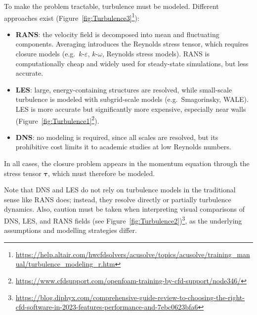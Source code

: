 To make the problem tractable, turbulence must be modeled. Different approaches exist (Figure~\ref{fig:Turbulence3}\footnote{\url{https://help.altair.com/hwcfdsolvers/acusolve/topics/acusolve/training_manual/turbulence_modeling_r.htm}}):  
\begin{itemize}
    \item \textbf{RANS}: the velocity field is decomposed into mean and fluctuating components. Averaging introduces the Reynolds stress tensor, which requires closure models (e.g.\ $k$-$\varepsilon$, $k$-$\omega$, Reynolds stress models). RANS is computationally cheap and widely used for steady-state simulations, but less accurate.  
    \item \textbf{LES}: large, energy-containing structures are resolved, while small-scale turbulence is modeled with subgrid-scale models (e.g.\ Smagorinsky, WALE). LES is more accurate but significantly more expensive, especially near walls (Figure~\ref{fig:Turbulence1}\footnote{\url{https://www.cfdsupport.com/openfoam-training-by-cfd-support/node346/}}).  
    \item \textbf{DNS}: no modeling is required, since all scales are resolved, but its prohibitive cost limits it to academic studies at low Reynolds numbers.  
\end{itemize}

In all cases, the closure problem appears in the momentum equation through the stress tensor $\boldsymbol{\tau}$, which must therefore be modeled.  

Note that DNS and LES do not rely on turbulence models in the traditional sense like RANS does; instead, they resolve directly or partially turbulence dynamics. Also, caution must be taken when interpreting visual comparisons of DNS, LES, and RANS fields (see Figure~\ref{fig:Turbulence2})\footnote{\url{https://blog.diphyx.com/comprehensive-guide-review-to-choosing-the-right-cfd-software-in-2023-features-performance-and-7ebc0623bfa6}}, as the underlying assumptions and modelling strategies differ.



\begin{figure}[H]

\end{figure}

